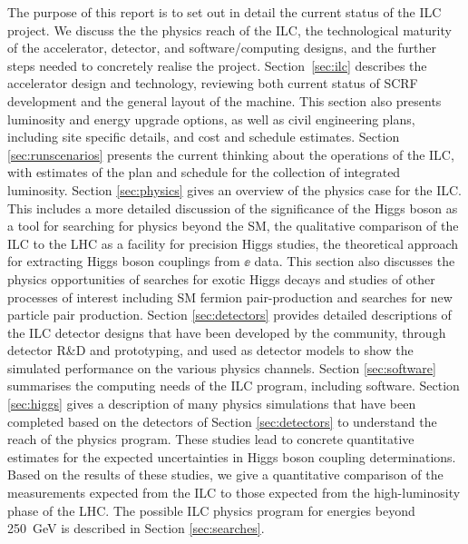 The purpose of this report is to set out in detail the current status
of the ILC project.  We discuss the 
the physics reach of the ILC, the technological maturity of the accelerator,
detector, and software/computing designs,
and the further steps 
 needed to concretely realise the project.  Section~\ref{sec:ilc}
 describes the accelerator design and technology, reviewing both 
 current status of SCRF development and the general layout of the
 machine.  This section also presents luminosity and energy upgrade
 options,  as well as civil engineering plans, including site
 specific details, and cost and schedule estimates.
 Section \ref{sec:runscenarios}  presents the current
 thinking about the operations of the ILC, with estimates of the plan
 and schedule for the 
 collection of integrated luminosity.
 Section \ref{sec:physics} gives an overview of the physics case for the ILC.
 This includes a more detailed discussion of the significance of the Higgs boson 
 as a tool for searching for physics beyond the SM, the qualitative
 comparison of the ILC to the LHC as a facility for precision Higgs
 studies, the theoretical approach for extracting Higgs boson
 couplings from $\ee$ data.  This section also discusses the physics
 opportunities of searches for exotic Higgs decays and studies of
 other processes of interest including SM fermion pair-production and
 searches for
 new particle pair production.  Section \ref{sec:detectors}
 provides detailed descriptions of the ILC detector designs
 that have been developed by the community,
 through detector R\&D and prototyping, and used as detector
 models to show the simulated performance on the various
 physics channels. Section \ref{sec:software}
 summarises the computing needs of the ILC program,
 including software.    Section \ref{sec:higgs}
 gives a description of many physics simulations
 that have been completed based on the detectors of
 Section \ref{sec:detectors} to understand the
 reach of the physics program.   These studies lead to  concrete
 quantitative estimates for the expected uncertainties in Higgs boson
 coupling determinations.   Based on the results of these studies, we
 give a quantitative comparison of the measurements expected from the
 ILC to those expected from the high-luminosity phase of the LHC.
 The possible ILC  physics program for energies
 beyond 250~GeV is described in
 Section \ref{sec:searches}.

